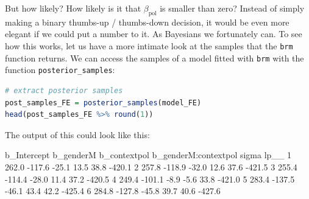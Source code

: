 \documentclass[nobib]{tufte-handout}
\begin{document}
But how likely? How likely is it that $\beta_{\text{pol}}$ is smaller than zero? Instead of simply making a binary thumbs-up / thumbs-down decision, it would be even more elegant if we could put a number to it. As Bayesians we fortunately can. To see how this works, let us have a more intimate look at the samples that the \texttt{brm} function returns. We can access the samples of a model fitted with \texttt{brm} with the function \texttt{posterior\_samples}:

\begin{minipage}[]{\textwidth}
\begin{lstlisting}[language=R]
# extract posterior samples 
post_samples_FE = posterior_samples(model_FE)
head(post_samples_FE %>% round(1))
\end{lstlisting}
\end{minipage}

\vspace{-0.5cm}

The output of this could look like this:

\begin{minipage}[]{1.2\textwidth}
\begin{rc}
  b_Intercept b_genderM b_contextpol b_genderM:contextpol sigma   lp__
1       262.0    -117.6        -25.1                 13.5  38.8 -420.1
2       257.8    -118.9        -32.0                 12.6  37.6 -421.5
3       255.4    -114.4        -28.0                 11.4  37.2 -420.5
4       249.4    -101.1         -8.9                 -5.6  33.8 -421.0
5       283.4    -137.5        -46.1                 43.4  42.2 -425.4
6       284.8    -127.8        -45.8                 39.7  40.6 -427.6
\end{rc}
\end{minipage}

\vspace{-0.5cm}
\end{document}
